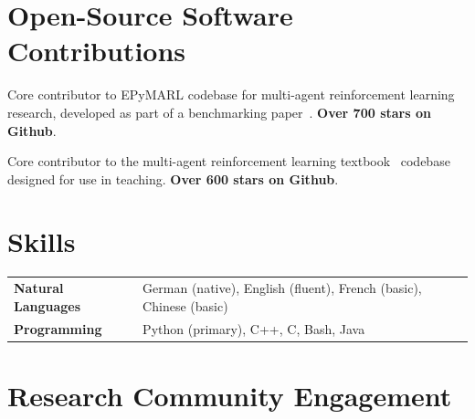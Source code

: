 \documentclass[a4paper,12pt]{article}
\begin{document}
\section{Open-Source Software Contributions}
\begin{expblock}
    Core contributor to EPyMARL codebase for multi-agent reinforcement learning research, developed as part of a benchmarking paper~\cite{papoudakis2021benchmarking}. \textbf{Over 700 stars on Github}.
\end{expblock}

\begin{expblock}
    Core contributor to the multi-agent reinforcement learning textbook~\cite{albrecht2024multi} codebase designed for use in teaching. \textbf{Over 600 stars on Github}.
\end{expblock}

\section{Skills}
\begin{tabularx}{\linewidth}{@{}l X@{}}
    \textbf{Natural Languages} & German (native), English (fluent), French (basic), Chinese (basic) \\
    \textbf{Programming} & Python (primary), C++, C, Bash, Java \\
\end{tabularx}

\section{Research Community Engagement}
\end{document}
